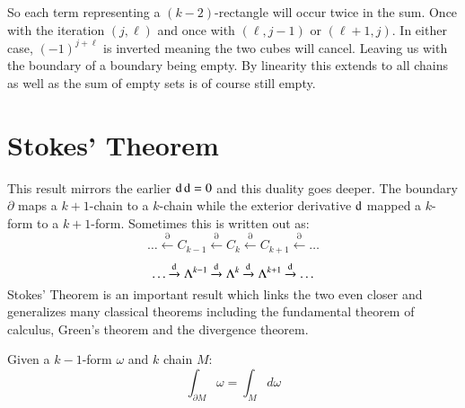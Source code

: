 So each term representing a $(k-2)$-rectangle will occur twice in the sum.
Once with the iteration $(j,\ell)$ and once with $(\ell, j-1)$ or $(\ell+1, j)$.
In either case, $(-1)^{j+\ell}$ is inverted meaning the two cubes will cancel.
Leaving us with the boundary of a boundary being empty.
By linearity this extends to all chains as well as the sum of empty sets is of course still empty.





%
%
\section{Stokes' Theorem}


This result mirrors the earlier $\mathop{}\!\mathrm{d} \mathop{}\!\mathrm{d} = 0$ and this duality goes deeper.
The boundary $\partial$ maps a $k+1$-chain to a $k$-chain while 
the exterior derivative $\mathop{}\!\mathrm{d}$ mapped a $k$-form to a $k+1$-form.
Sometimes this is written out as:
\begin{equation*}
	\ldots 	\xleftarrow{\partial} C_{k-1} 
			\xleftarrow{\partial} C_k 
			\xleftarrow{\partial} C_{k+1} 
			\xleftarrow{\partial} \ldots
\end{equation*}
\begin{equation*}
	\ldots 	\xrightarrow{\mathop{}\!\mathrm{d}} \Lambda^{k-1} 
			\xrightarrow{\mathop{}\!\mathrm{d}} \Lambda^k 
			\xrightarrow{\mathop{}\!\mathrm{d}} \Lambda^{k+1} 
			\xrightarrow{\mathop{}\!\mathrm{d}} \ldots
\end{equation*}
Stokes' Theorem is an important result which links the two even closer and generalizes many classical theorems including
the fundamental theorem of calculus, Green's theorem and the divergence theorem.


Given a $k-1$-form $\omega$ and $k$ chain $M$:
\begin{equation}
	\tag{Stokes' Theorem}
	\int_{\partial M} \omega = \int_M d\omega
\end{equation}


